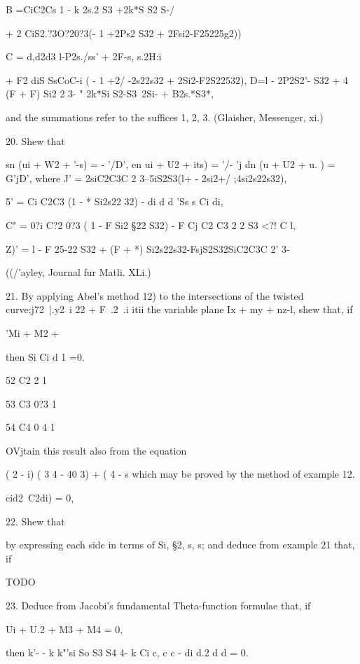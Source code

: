 B =CiC2Cs 1 - k 2s.2 S3 +2k*S S2 S-/

+ 2 CiS2.?3O?20?3(- 1 +2Ps2 S32 + 2Fsi2-F25225g2))

C = d,d2d3 l-P2s./ss' + 2F-s, s.2H:i

+ F2 diS SsCoC-i ( - 1 +2/ -2s22s32 + 2Si2-F2S22532), D=l - 2P2S2'-
S32 + 4 (F + F) Si2 2 3- " 2k*Si S2-S3~2Si- + B2s.*S3*,

and the summations refer to the suffices 1, 2, 3. (Glaisher,
Messenger, xi.)

20. Shew that

sn (ui + W2 + '-s) = - '/D', en ui + U2 + its) = '/- 'j dn (u + U2 +
u. ) = G'jD', where J' = 2siC2C3C 2 3--5iS2S3(l+ - 2si2+/
;4si2s22s32),

5' = Ci C2C3 (1 - * Si2s22 32) - di d d 'Ss s Ci di,

C" = 0?i C?2 0?3 ( 1 - F Si2 §22 S32) - F Cj C2 C3 2 2 S3 <?! C l,

Z)' = l - F 25-22 S32 + (F + *) Si2s22s32-FsjS2S32SiC2C3C 2' 3-

((/'ayley, Journal fur Matli. XLi.)

21. By applying Abel's method  12) to the intersections of the
twisted curve;j72\ |.y2\ i 22 + F\ .2\ .i itii the variable plane Ix
+ my + nz-l, shew that, if

'Mi + M2 + %

then Si Ci d 1 =0.

52 C2 2 1

53 C3 0?3 1

54 C4 0 4 1

OVjtain this result also from the equation

( 2 - i) ( 3 4 - 40 3) + ( 4 - s which may be proved by the method of
example 12.

 cid2~C2di) = 0,


%
%

22. Shew that

by expressing each side in terms of Si, §2, s, s; and deduce from
example 21 that, if

TODO


23. Deduce from Jacobi's fundamental Theta-function formulae that, if

Ui + U.2 + M3 + M4 = 0,

then k'- - k k"'si So S3 S4 4- k Ci c, c c - di d.2 d d = 0.

